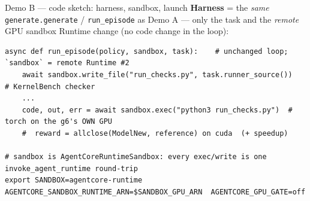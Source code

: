 \documentclass[aspectratio=169]{beamer}
\begin{document}
\begin{frame}[fragile]{Demo B --- code sketch: harness, sandbox, launch}
  \footnotesize\textbf{Harness} = the \emph{same} \texttt{generate.generate} / \texttt{run\_episode} as Demo A
  --- only the task and the \emph{remote} GPU sandbox Runtime change (no code change in the loop):
\begin{lstlisting}[basicstyle=\ttfamily\scriptsize]
async def run_episode(policy, sandbox, task):    # unchanged loop; `sandbox` = remote Runtime #2
    await sandbox.write_file("run_checks.py", task.runner_source())   # KernelBench checker
    ...
    code, out, err = await sandbox.exec("python3 run_checks.py")  # torch on the g6's OWN GPU
    #  reward = allclose(ModelNew, reference) on cuda  (+ speedup)

# sandbox is AgentCoreRuntimeSandbox: every exec/write is one invoke_agent_runtime round-trip
export SANDBOX=agentcore-runtime  AGENTCORE_SANDBOX_RUNTIME_ARN=$SANDBOX_GPU_ARN  AGENTCORE_GPU_GATE=off
\end{lstlisting}
\end{frame}
\end{document}
